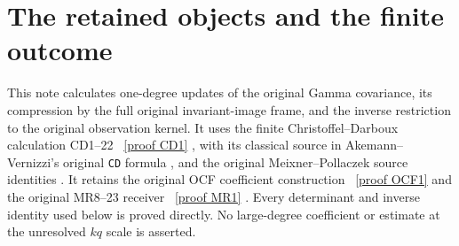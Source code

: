 \documentclass[11pt]{article}
\begin{document}
\section{The retained objects and the finite outcome}

This note calculates one-degree updates of the original Gamma covariance,
its compression by the full original invariant-image frame, and the
inverse restriction to the original observation kernel. It uses the
finite Christoffel--Darboux calculation CD1--22 \cite{dsroot:CD}%
~\href{https://github.com/KokunoYumeto/zeta-function-research-reader/blob/main/workbenches/splitzero-tandem/continuations/20260921-kernel-degree-steps/COMPLETE_CD_BOUNDARY.tex\#L42}{[proof CD1]}%
{}, with its
classical source in Akemann--Vernizzi's original \texttt{CD} formula
\cite{dsroot:AV}, and the original Meixner--Pollaczek source identities
\cite{dsroot:DLMF}. It retains the original OCF coefficient construction
\cite{dsroot:OCF}%
~\href{https://github.com/KokunoYumeto/zeta-function-research-reader/blob/5992ad50c0f2a06921f1fcaded7b4e38097c0739/workbenches/splitzero-tandem/continuations/20260920-original-kernel-mixed-determinants/providers/ORIGINAL_CONDUCTOR_STRIP_FRAME.tex\#L27}{[proof OCF1]}%
{} and the original MR8--23 receiver \cite{dsroot:MR}%
~\href{https://github.com/KokunoYumeto/zeta-function-research-reader/blob/5992ad50c0f2a06921f1fcaded7b4e38097c0739/workbenches/splitzero-tandem/continuations/20260920-original-kernel-mixed-determinants/ORIGINAL_KERNEL_MIXED_DETERMINANT.tex\#L36}{[proof MR1]}%
{}.
Every determinant and inverse identity used below is proved directly.
No large-degree coefficient or estimate at the unresolved \(kq\) scale
is asserted.
\end{document}
